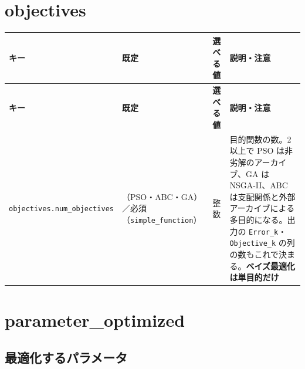 \section{objectives}

\begingroup\small
\begin{longtable}{>{\raggedright\arraybackslash}p{}>{\raggedright\arraybackslash}p{}>{\raggedright\arraybackslash}p{}>{\raggedright\arraybackslash}p{}}
\toprule
\textbf{キー} & \textbf{既定} & \textbf{選べる値} & \textbf{説明・注意} \\
\midrule
\endfirsthead
\toprule
\textbf{キー} & \textbf{既定} & \textbf{選べる値} & \textbf{説明・注意} \\
\midrule
\endhead
\bottomrule
\endlastfoot
\texttt{objectives.\allowbreak{}num\_\allowbreak{}objectives} & 1（PSO・ABC・GA）／必須（\texttt{simple\_\allowbreak{}function}） & 整数 & 目的関数の数。2 以上で PSO は非劣解のアーカイブ、GA は NSGA-II、ABC は支配関係と外部アーカイブによる多目的になる。出力の \texttt{Error\_\allowbreak{}k}・\texttt{Objective\_\allowbreak{}k} の列の数もこれで決まる。\textbf{ベイズ最適化は単目的だけ} \\
\end{longtable}
\endgroup

\section{parameter\_optimized}

\subsection{最適化するパラメータ}

